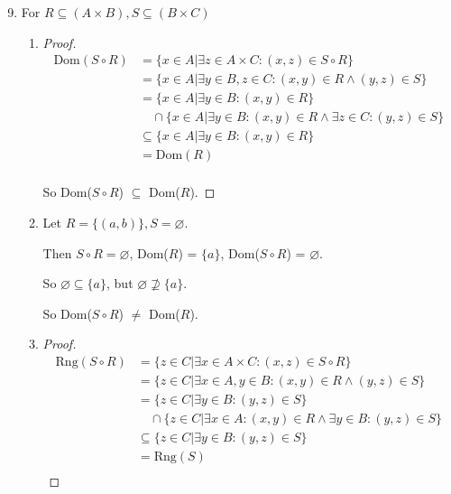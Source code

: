 \documentclass[12pt,letterpaper]{article}
\begin{document}
\begin{enumerate}
\begin{enumerate}
        \setcounter{enumii}{8}
        \item
          For $R \subseteq (A \times B), S \subseteq (B \times C)$
          \begin{enumerate}
            \item
              \begin{proof}
                \begin{align*}
                  \text{Dom}(S \circ R)
                  &= \{x \in A | \exists z \in A \times C : (x, z) \in S \circ R\} \\
                  &= \{x \in A | \exists y \in B, z \in C : (x, y) \in R \land (y, z) \in S\} \\
                  &= \{x \in A | \exists y \in B : (x, y) \in R\} \\
                  &\quad \cap \{x \in A | \exists y \in B : (x, y) \in R \land \exists z \in C : (y, z) \in S\} \\
                  &\subseteq \{x \in A | \exists y \in B : (x, y) \in R\} \\
                  &= \text{Dom}(R) \\
                \end{align*}

                So Dom($S \circ R$) $\subseteq$ Dom($R$).
              \end{proof}
            \item
              Let $R = \{(a, b)\}, S = \varnothing$.

              Then $S \circ R = \varnothing$, Dom($R$) = $\{a\}$, Dom($S \circ R$) = $\varnothing$.

              So $\varnothing \subseteq \{a\}$, but $\varnothing \not\supseteq \{a\}$.

              So Dom($S \circ R$) $\neq$ Dom($R$).
            \item
              \begin{proof}
                \begin{align*}
                  \text{Rng}(S \circ R)
                  &= \{z \in C | \exists x \in A \times C : (x, z) \in S \circ R\} \\
                  &= \{z \in C | \exists x \in A, y \in B : (x, y) \in R \land (y, z) \in S\} \\
                  &= \{z \in C | \exists y \in B : (y, z) \in S\} \\
                  &\quad \cap \{z \in C | \exists x \in A : (x, y) \in R \land \exists y \in B : (y, z) \in S\} \\
                  &\subseteq \{z \in C | \exists y \in B : (y, z) \in S\} \\
                  &= \text{Rng}(S) \\
                \end{align*}


\end{proof}
\end{enumerate}
\end{enumerate}
\end{enumerate}
\end{document}
